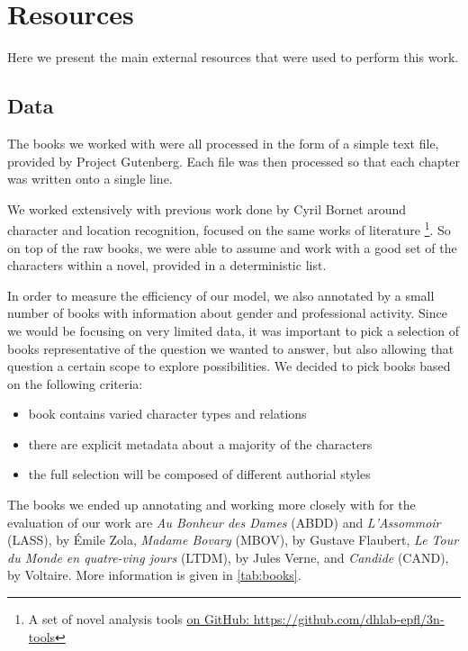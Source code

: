\section{Resources}
Here we present the main external resources that were used to perform this work.

\subsection{Data} \label{ssec:data}
The books we worked with were all processed in the form of a simple text file, provided by Project Gutenberg. Each file was then processed so that each chapter was written onto a single line.

We worked extensively with previous work done by Cyril Bornet around character and location recognition, focused on the same works of literature \footnote{A set of novel analysis tools \href{https://github.com/dhlab-epfl/3n-tools}{on GitHub: https://github.com/dhlab-epfl/3n-tools}}. So on top of the raw books, we were able to assume and work with a good set of the characters within a novel, provided in a deterministic list.

In order to measure the efficiency of our model, we also annotated by a small number of books with information about gender and professional activity. Since we would be focusing on very limited data, it was important to pick a selection of books representative of the question we wanted to answer, but also allowing that question a certain scope to explore possibilities. We decided to pick books based on the following criteria:
\begin{itemize}
\item book contains varied character types and relations 
\item there are explicit metadata about a majority of the characters
\item the full selection will be composed of different authorial styles 
\end{itemize}

The books we ended up annotating and working more closely with for the evaluation of our work are \textit{Au Bonheur des Dames} (ABDD) and \textit{L'Assommoir} (LASS), by Émile Zola, \textit{Madame Bovary} (MBOV), by Gustave Flaubert, \textit{Le Tour du Monde en quatre-ving jours} (LTDM), by Jules Verne, and \textit{Candide} (CAND), by Voltaire. More information is given in \cref{tab:books}. 

